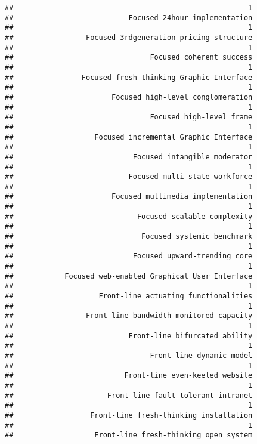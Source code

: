 \documentclass[
]{article}
\begin{document}
\begin{verbatim}
##                                                       1 
##                           Focused 24hour implementation 
##                                                       1 
##                 Focused 3rdgeneration pricing structure 
##                                                       1 
##                                Focused coherent success 
##                                                       1 
##                Focused fresh-thinking Graphic Interface 
##                                                       1 
##                       Focused high-level conglomeration 
##                                                       1 
##                                Focused high-level frame 
##                                                       1 
##                   Focused incremental Graphic Interface 
##                                                       1 
##                            Focused intangible moderator 
##                                                       1 
##                           Focused multi-state workforce 
##                                                       1 
##                       Focused multimedia implementation 
##                                                       1 
##                             Focused scalable complexity 
##                                                       1 
##                              Focused systemic benchmark 
##                                                       1 
##                            Focused upward-trending core 
##                                                       1 
##            Focused web-enabled Graphical User Interface 
##                                                       1 
##                    Front-line actuating functionalities 
##                                                       1 
##                 Front-line bandwidth-monitored capacity 
##                                                       1 
##                           Front-line bifurcated ability 
##                                                       1 
##                                Front-line dynamic model 
##                                                       1 
##                          Front-line even-keeled website 
##                                                       1 
##                      Front-line fault-tolerant intranet 
##                                                       1 
##                  Front-line fresh-thinking installation 
##                                                       1 
##                   Front-line fresh-thinking open system 

\end{verbatim}
\end{document}
